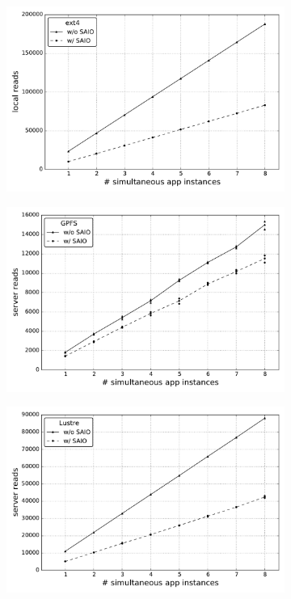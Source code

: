 \begin{figure}[]
  \centering
  \begin{subfigure}[]{0.70\textwidth}
    \centering
    \includegraphics[width=\textwidth]{figures/reads_simult_instance_ext4_test_cluster}
    \caption{\textit{}}
    \label{figure: ext4_4}
  \end{subfigure}
  \begin{subfigure}[]{0.70\textwidth}
    \centering
    \includegraphics[width=\textwidth]{figures/reads_simult_instance_gpfs_test_cluster}
    \caption{\textit{}}
    \label{figure: gpfs_4}
  \end{subfigure}
  \begin{subfigure}[]{0.70\textwidth}
    \centering
    \includegraphics[width=\textwidth]{figures/reads_multiple_simult_procs_Lustre_testcluster}

\end{subfigure}
\end{figure}
